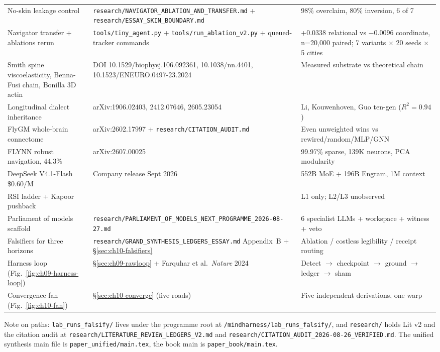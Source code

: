 \begin{center}
\begin{tabular}{p{3.6cm}p{5.2cm}p{4.4cm}}
No-skin leakage control & \texttt{research/NAVIGATOR\_ABLATION\_AND\_TRANSFER.md} + \texttt{research/ESSAY\_SKIN\_BOUNDARY.md} & 98\% overclaim, 80\% inversion, 6 of 7 \\
Navigator transfer + ablations rerun & \texttt{tools/tiny\_agent.py} + \texttt{tools/run\_ablation\_v2.py} + queued-tracker commands & +0.0338 relational vs $-$0.0096 coordinate, n=20,000 paired; 7 variants $\times$ 20 seeds $\times$ 5 cities \\
Smith spine viscoelasticity, Benna-Fusi chain, Bonilla 3D actin & DOI 10.1529/biophysj.106.092361, 10.1038/nn.4401, 10.1523/ENEURO.0497-23.2024 & Measured substrate vs theoretical chain \\
Longitudinal dialect inheritance & arXiv:1906.02403, 2412.07646, 2605.23054 & Li, Kouwenhoven, Guo ten-gen ($R^2=0.94$) \\
FlyGM whole-brain connectome & arXiv:2602.17997 + \texttt{research/CITATION\_AUDIT.md} \cite{flygm2026} & Even unweighted wins vs rewired/random/MLP/GNN \\
FLYNN robust navigation, 44.3\% & arXiv:2607.00025 \cite{flynn2026} & 99.97\% sparse, 139K neurons, PCA modularity \\
DeepSeek V4.1-Flash \$0.60/M & Company release Sept 2026 \cite{deepseek2026} & 552B MoE + 196B Engram, 1M context \\
RSI ladder + Kapoor pushback & \cite{kapoor2026,anthropic2026,weco2026,dreamrsi2026} & L1 only; L2/L3 unobserved \\
Parliament of models scaffold & \texttt{research/PARLIAMENT\_OF\_MODELS\_NEXT\_PROGRAMME\_2026-08-27.md} & 6 specialist LLMs + workspace + witness + veto \\
Falsifiers for three horizons & \texttt{research/GRAND\_SYNTHESIS\_LEDGERS\_ESSAY.md} Appendix~B + \S\ref{sec:ch10-falsifiers} & Ablation / costless legibility / receipt routing \\
Harness loop (Fig.~\ref{fig:ch09-harness-loop}) & \S\ref{sec:ch09-rawloop} + Farquhar et al.\ \textit{Nature} 2024 & Detect $\to$ checkpoint $\to$ ground $\to$ ledger $\to$ sham \\
Convergence fan (Fig.~\ref{fig:ch10-fan}) & \S\ref{sec:ch10-converge} (five roads) & Five independent derivations, one warp \\
\bottomrule
\end{tabular}
\end{center}

Note on paths: \texttt{lab\_runs\_falsify/} lives under the programme root at \texttt{/mindharness/lab\_runs\_falsify/}, and \texttt{research/} holds Lit v2 and the citation audit at \texttt{research/LITERATURE\_REVIEW\_LEDGERS\_V2.md} and \texttt{research/CITATION\_AUDIT\_2026-08-26\_VERIFIED.md}. The unified synthesis main file is \texttt{paper\_unified/main.tex}, the book main is \texttt{paper\_book/main.tex}.

